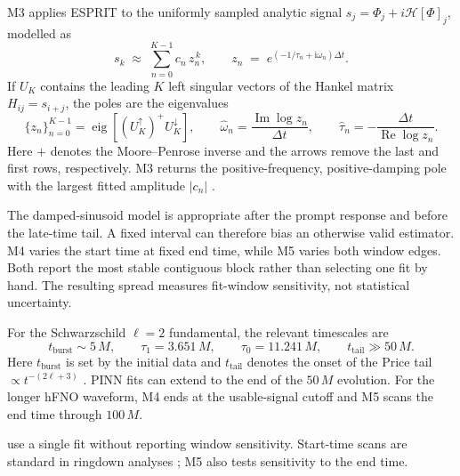M3 applies ESPRIT \citep{Roy1989esprit} to the uniformly sampled
analytic signal $s_j=\Phi_j+i\mathcal H[\Phi]_j$, modelled as
\begin{equation}
  s_k
  \;\approx\; \sum_{n=0}^{K-1} c_{n}\, z_{n}^{\,k},
  \qquad
  z_{n} \;=\; e^{(-1/\tau_{n} + \mathrm{i}\omega_{n})\Delta t}.
  \label{eq:esprit-model}
\end{equation}
If $U_K$ contains the leading $K$ left singular vectors of the
Hankel matrix $H_{ij}=s_{i+j}$, the poles are the eigenvalues
\begin{equation}
  \{z_n\}_{n=0}^{K-1}
  =\operatorname{eig}\!\left[
  (U_K^{\uparrow})^{+}U_K^{\downarrow}\right],
  \qquad
  \widehat\omega_n=\frac{\operatorname{Im}\log z_n}{\Delta t},
  \qquad
  \widehat\tau_n=-\frac{\Delta t}{\operatorname{Re}\log z_n}.
  \label{eq:esprit-poles}
\end{equation}
Here $+$ denotes the Moore--Penrose inverse and the arrows remove the
last and first rows, respectively. M3 returns the positive-frequency,
positive-damping pole with the largest fitted amplitude $|c_n|$
\citep{HuaSarkar1990,Roy1989esprit}.

The damped-sinusoid model is appropriate after the prompt response
and before the late-time tail. A fixed interval can therefore bias an
otherwise valid estimator. M4 varies the start time at fixed end time,
while M5 varies both window edges. Both report the most stable
contiguous block rather than selecting one fit by hand. The resulting
spread measures fit-window sensitivity, not statistical uncertainty.

For the Schwarzschild $\ell=2$ fundamental, the relevant timescales
are
\begin{equation}
  t_{\mathrm{burst}} \sim 5\,M, \qquad
  \tau_1 = 3.651\,M, \qquad
  \tau_0 = 11.241\,M, \qquad
  t_{\mathrm{tail}} \gg 50\,M.
  \label{eq:timescales}
\end{equation}
Here $t_{\mathrm{burst}}$ is set by the initial data and
$t_{\mathrm{tail}}$ denotes the onset of the Price tail
$\propto t^{-(2\ell+3)}$ \citep{Berti2009review}. PINN fits can
extend to the end of the $50\,M$ evolution. For the longer hFNO
waveform, M4 ends at the usable-signal cutoff and M5 scans the end
time through $100\,M$.

\citet{Patel2024pinn} use a single fit without reporting window
sensitivity. Start-time scans are standard in ringdown analyses
\citep{Buonanno2007ringdown,LIGO2016ringdown,Isi2021priors}; M5 also
tests sensitivity to the end time.

